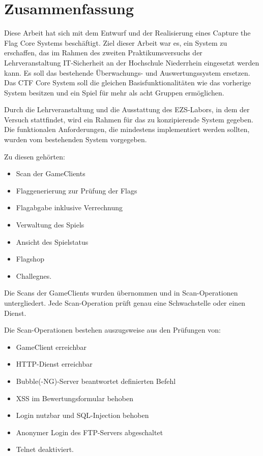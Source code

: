 \section{Zusammenfassung}
Diese Arbeit hat sich mit dem Entwurf und der Realisierung eines Capture the Flag Core Systems beschäftigt. Ziel dieser Arbeit war es, ein System zu erschaffen, das im Rahmen des zweiten Praktikumsversuchs der Lehrveranstaltung IT-Sicherheit an der Hochschule Niederrhein eingesetzt werden kann. Es soll das bestehende Überwachungs- und Auswertungssystem ersetzen. Das CTF Core System soll die gleichen Basisfunktionalitäten wie das vorherige System besitzen und ein Spiel für mehr als acht Gruppen ermöglichen.

Durch die Lehrveranstaltung und die Ausstattung des EZS-Labors, in dem der Versuch stattfindet, wird ein Rahmen für das zu konzipierende System gegeben.
Die funktionalen Anforderungen, die mindestens implementiert werden sollten, wurden vom bestehenden System vorgegeben.

Zu diesen gehörten:
\begin{itemize}
	\item Scan der GameClients
	\item Flaggenerierung zur Prüfung der Flags
	\item Flagabgabe inklusive Verrechnung
	\item Verwaltung des Spiels
	\item Ansicht des Spielstatus
	\item Flagshop
	\item Challegnes.
\end{itemize}

Die Scans der GameClients wurden übernommen und in Scan-Operationen untergliedert. Jede Scan-Operation prüft genau eine Schwachstelle oder einen Dienst.

Die Scan-Operationen bestehen auszugsweise aus den Prüfungen von:
\begin{itemize}
	\item GameClient erreichbar
	\item HTTP-Dienst erreichbar
	\item Bubble(-NG)-Server beantwortet definierten Befehl
	\item XSS im Bewertungsformular behoben
	\item Login nutzbar und SQL-Injection behoben
	\item Anonymer Login des FTP-Servers abgeschaltet
	\item Telnet deaktiviert.
\end{itemize}

